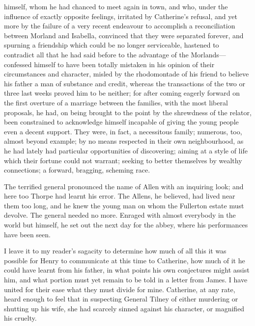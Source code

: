 himself, whom he had chanced to meet again in town, and who, under the influence of exactly opposite feelings, irritated by Catherine's refusal, and yet more by the failure of a very recent endeavour to accomplish a reconciliation between Morland and Isabella, convinced that they were separated forever, and spurning a friendship which could be no longer serviceable, hastened to contradict all that he had said before to the advantage of the Morlands—confessed himself to have been totally mistaken in his opinion of their circumstances and character, misled by the rhodomontade of his friend to believe his father a man of substance and credit, whereas the transactions of the two or three last weeks proved him to be neither; for after coming eagerly forward on the first overture of a marriage between the families, with the most liberal proposals, he had, on being brought to the point by the shrewdness of the relator, been constrained to acknowledge himself incapable of giving the young people even a decent support. They were, in fact, a necessitous family; numerous, too, almost beyond example; by no means respected in their own neighbourhood, as he had lately had particular opportunities of discovering; aiming at a style of life which their fortune could not warrant; seeking to better themselves by wealthy connections; a forward, bragging, scheming race. 

 The terrified general pronounced the name of Allen with an inquiring look; and here too Thorpe had learnt his error. The Allens, he believed, had lived near them too long, and he knew the young man on whom the Fullerton estate must devolve. The general needed no more. Enraged with almost everybody in the world but himself, he set out the next day for the abbey, where his performances have been seen. 

 I leave it to my reader's sagacity to determine how much of all this it was possible for Henry to communicate at this time to Catherine, how much of it he could have learnt from his father, in what points his own conjectures might assist him, and what portion must yet remain to be told in a letter from James. I have united for their ease what they must divide for mine. Catherine, at any rate, heard enough to feel that in suspecting General Tilney of either murdering or shutting up his wife, she had scarcely sinned against his character, or magnified his cruelty. 

